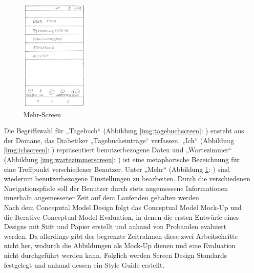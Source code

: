 \begin{figure}[H]
	\centering
	\includegraphics[width=0.3\textwidth]{images/mehrscreen.png}
	\captionsetup{justification=centering}
	\caption{Mehr-Screen}
	\label{img:mehrscreen}
\end{figure}
Die Begriffswahl für „Tagebuch“ (Abbildung \ref{img:tagebuchscreen}: ) ensteht aus der Domäne, das Diabetiker „Tagebucheinträge“ verfassen.  „Ich“ (Abbildung \ref{img:ichscreen}: ) repräsentiert benutzerbezogene Daten und „Wartezimmer“ (Abbildung \ref{img:wartezimmerscreen}: ) ist eine metaphorische Bezeichnung für eine Treffpunkt verschiedener Benutzer. Unter „Mehr“ (Abbildung \ref{img:mehrscreen}: ) sind wiederum benutzerbezogene Einstellungen zu bearbeiten. Durch die verschiedenen Navigationspfade soll der Benutzer durch stets angemessene Informationen innerhaln angemessener Zeit auf dem Laufenden gehalten werden.\\
Nach dem Conceputal Model Design folgt das Conceptual Model Mock-Up und die Iterative Conceptual Model Evaluation, in denen die ersten Entwürfe eines Designs mit Stift und Papier erstellt  und anhand von Probanden evaluiert werden. Da allerdings gibt der begrenzte Zeitrahmen diese zwei Arbeitschritte nicht her, wodurch die Abbildungen als Mock-Up dienen und eine Evaluation nicht durchgeführt werden kann. Folglich werden Screen Design Standards festgelegt und anhand dessen ein Style Guide erstellt.
